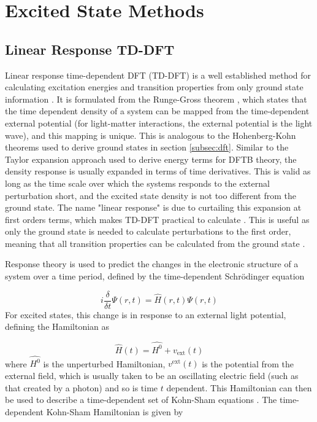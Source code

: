 \section{Excited State Methods}
\label{sec:response_theories}

\subsection{Linear Response TD-DFT}
\label{subsec:tddft}

Linear response time-dependent DFT (TD-DFT) is a well established method for calculating
excitation energies and transition properties from only ground state information \cite{Laurent2013}. 
It is formulated from the Runge-Gross theorem \cite{Runge1984}, which states that the
time dependent density of a system can be mapped from the time-dependent external 
potential (for light-matter interactions, the external potential is the light wave), 
and this mapping is unique. This is analogous to the Hohenberg-Kohn theorems used
to derive ground states in section \ref{subsec:dft}. Similar to the Taylor expansion
approach used to derive energy terms for DFTB theory, the density response is usually
expanded in terms of time derivatives. This is valid as long as the time scale over
which the systems responds to the external perturbation short, and the excited state
density is not too different from the ground state. The name "linear response" is
due to curtailing this expansion at first orders terms, which makes TD-DFT practical 
to calculate \cite{Marques2004}. This is useful as only the ground state is needed 
to calculate perturbations to the first order, meaning that all transition properties
can be calculated from the ground state \cite{Marques2004}.

Response theory is used to predict the changes in the electronic structure of a 
system over a time period, defined by the time-dependent Schr\"{o}dinger equation

\begin{equation}
    i \frac{\delta}{\delta t} \Psi\left(r, t\right) = \hat{H}\left(r, t\right) \Psi\left(r, t\right)
\end{equation}
%
For excited states, this change is in response to an external light potential, defining
the Hamiltonian as

\begin{equation}
\hat{H}\left(t\right) = \hat{H^0} + v_{\text{ext}}\left(t\right)
\end{equation}
%
where $\hat{H^0}$ is the unperturbed Hamiltonian, $v^{\text{ext}}\left(t\right)$ 
is the potential from the external field, which is usually taken to be an oscillating 
electric field (such as that created by a photon) and so is time $t$ dependent. 
This Hamiltonian can then be used to describe a time-dependent set of Kohn-Sham 
equations \cite{Kohn1964}. The time-dependent Kohn-Sham Hamiltonian is given by

